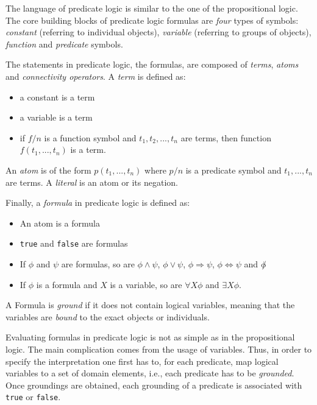 The language of predicate logic is similar to the one of the propositional logic.
The core building blocks of predicate logic formulas are \textit{four} types of symbols: \textit{constant} (referring to individual objects), \textit{variable} (referring to groups of objects), \textit{function} and \textit{predicate} symbols.


The statements in predicate logic, the formulas, are composed of \textit{terms}, \textit{atoms} and \textit{connectivity operators}.
A \textit{term} is defined as:
\begin{itemize}
	\item a constant is a term
	\item a variable is a term
	\item if $f / n$ is a function symbol and $t_1,t_2,...,t_n$ are terms, then function $f(t_1,...,t_n)$ is a term.
\end{itemize}


An \textit{atom} is of the form $p(t_1,...,t_n)$ where $p/n$ is a predicate symbol and $t_1,...,t_n$ are terms.
A \textit{literal} is an atom or its negation.


Finally, a \textit{formula} in predicate logic is defined as:
\begin{itemize}
	\item An atom is a formula
	\item \texttt{true} and \texttt{false} are formulas
	\item If $\phi$ and $\psi$ are formulas, so are $\phi \wedge \psi$, $\phi \vee \psi$, $\phi \Rightarrow \psi$, $\phi \Leftrightarrow \psi$ and $\not \phi$
	\item If $\phi$ is a formula and $X$ is a variable, so are $\forall X \phi$ and $\exists X \phi$.
\end{itemize}


A Formula is \textit{ground} if it does not contain logical variables, meaning that the variables are \textit{bound} to the exact objects or individuals.







Evaluating formulas in predicate logic is not as simple as in the propositional logic.
The main complication comes from the usage of variables.
Thus, in order to specify the interpretation one first has to, for each predicate,  map logical variables to a set of domain elements, i.e., each predicate has to be \textit{grounded}.
Once groundings are obtained, each grounding of a predicate is associated with \texttt{true} or \texttt{false}.



